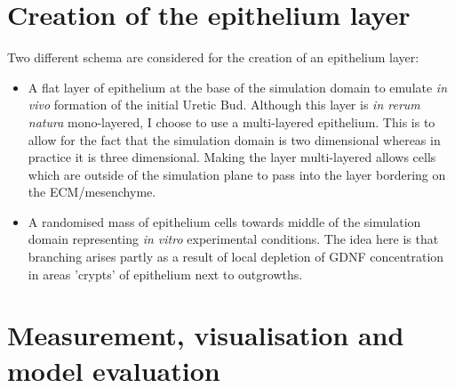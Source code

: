 \documentclass[pdftex,10pt,a4paper]{article}
\begin{document}
\section{Creation of the epithelium layer}
Two different schema are considered for the creation of an epithelium layer:
\begin{itemize}
\item A flat layer of epithelium at the base of the simulation domain to emulate \textit{in vivo} formation of the initial Uretic Bud. Although this layer is \textit{in rerum natura} mono-layered, I choose to use a multi-layered epithelium. This is to allow for the fact that the simulation domain is two dimensional whereas in practice it is three dimensional. Making the layer multi-layered allows cells which are outside of the simulation plane to pass into the layer bordering on the ECM/mesenchyme.
\item A randomised mass of epithelium cells towards middle of the simulation domain representing \textit{in vitro} experimental conditions. The idea here is that branching arises partly as a result of local depletion of GDNF concentration in areas 'crypts' of epithelium next to outgrowths.
\end{itemize}

\section{Measurement, visualisation and model evaluation}
\end{document}

